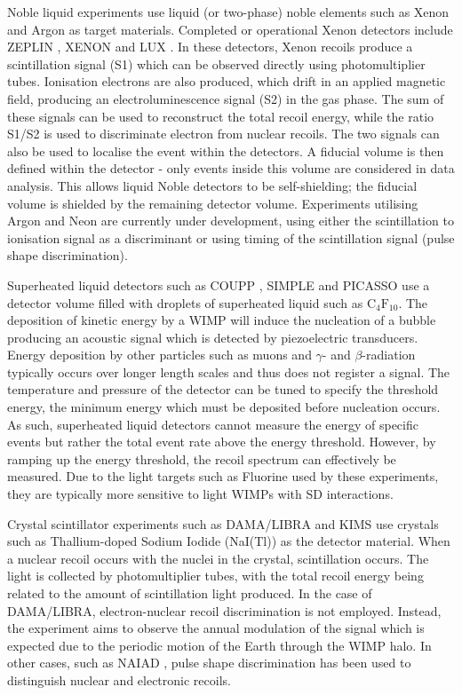 Noble liquid experiments use liquid (or two-phase) noble elements such as Xenon and Argon as target materials. Completed or operational Xenon detectors include ZEPLIN \cite{Akimov:2012}, XENON \cite{Aprile:2011} and LUX \cite{Akerib:2014}. In these detectors, Xenon recoils produce a scintillation signal (S1) which can be observed directly using photomultiplier tubes. Ionisation electrons are also produced, which drift in an applied magnetic field, producing an electroluminescence signal (S2) in the gas phase. The sum of these signals can be used to reconstruct the total recoil energy, while the ratio S1/S2 is used to discriminate electron from nuclear recoils. The two signals can also be used to localise the event within the detectors. A fiducial volume is then defined within the detector - only events inside this volume are considered in data analysis. This allows liquid Noble detectors to be self-shielding; the fiducial volume is shielded by the remaining detector volume. Experiments utilising Argon \cite{Marchionni:2011, Badertscher:2013} and Neon \cite{Boulay:2008} are currently under development, using either the scintillation to ionisation signal as a discriminant or using timing of the scintillation signal (pulse shape discrimination).

Superheated liquid detectors such as COUPP \cite{Behnke:2011}, SIMPLE \cite{Felizardo:2012} and PICASSO \cite{Archambault:2012} use a detector volume filled with droplets of superheated liquid such as $\textrm{C}_4\textrm{F}_{10}$. The deposition of kinetic energy by a WIMP will induce the nucleation of a bubble producing an acoustic signal which is detected by piezoelectric transducers. Energy deposition by other particles such as muons and $\gamma$- and $\beta$-radiation typically occurs over longer length scales and thus does not register a signal. The temperature and pressure of the detector can be tuned to specify the threshold energy, the minimum energy which must be deposited before nucleation occurs. As such, superheated liquid detectors cannot measure the energy of specific events but rather the total event rate above the energy threshold. However, by ramping up the energy threshold, the recoil spectrum can effectively be measured. Due to the light targets such as Fluorine used by these experiments, they are typically more sensitive to light WIMPs with SD interactions.

Crystal scintillator experiments \cite{Kim:2010} such as DAMA/LIBRA \cite{Bernabei:2008a,Bernabei:2010,Bernabei:2013} and KIMS \cite{Lee:2007} use crystals such as Thallium-doped Sodium Iodide (NaI(Tl)) as the detector material. When a nuclear recoil occurs with the nuclei in the crystal, scintillation occurs. The light is collected by photomultiplier tubes, with the total recoil energy being related to the amount of scintillation light produced. In the case of DAMA/LIBRA, electron-nuclear recoil discrimination is not employed. Instead, the experiment aims to observe the annual modulation of the signal which is expected due to the periodic motion of the Earth through the WIMP halo. In other cases, such as NAIAD \cite{Ahmed:2003}, pulse shape discrimination has been used to distinguish nuclear and electronic recoils.

